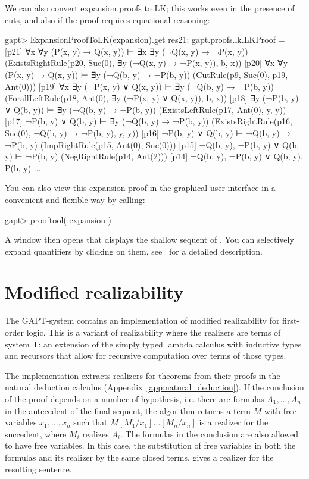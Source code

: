 \documentclass[a4paper,11pt]{book}
\newcommand{\cli}[1]{{\ttfamily {#1}}}
\begin{document}
We can also convert expansion proofs to LK; this works even in the presence of
cuts, and also if the proof requires equational reasoning:
\begin{clilisting}
gapt> ExpansionProofToLK(expansion).get
res21: gapt.proofs.lk.LKProof =
[p21] ∀x ∀y (P(x, y) → Q(x, y)) ⊢ ∃x ∃y (¬Q(x, y) → ¬P(x, y))    (ExistsRightRule(p20, Suc(0), ∃y (¬Q(x, y) → ¬P(x, y)), b, x))
[p20] ∀x ∀y (P(x, y) → Q(x, y)) ⊢ ∃y (¬Q(b, y) → ¬P(b, y))    (CutRule(p9, Suc(0), p19, Ant(0)))
[p19] ∀x ∃y (¬P(x, y) ∨ Q(x, y)) ⊢ ∃y (¬Q(b, y) → ¬P(b, y))    (ForallLeftRule(p18, Ant(0), ∃y (¬P(x, y) ∨ Q(x, y)), b, x))
[p18] ∃y (¬P(b, y) ∨ Q(b, y)) ⊢ ∃y (¬Q(b, y) → ¬P(b, y))    (ExistsLeftRule(p17, Ant(0), y, y))
[p17] ¬P(b, y) ∨ Q(b, y) ⊢ ∃y (¬Q(b, y) → ¬P(b, y))    (ExistsRightRule(p16, Suc(0), ¬Q(b, y) → ¬P(b, y), y, y))
[p16] ¬P(b, y) ∨ Q(b, y) ⊢ ¬Q(b, y) → ¬P(b, y)    (ImpRightRule(p15, Ant(0), Suc(0)))
[p15] ¬Q(b, y), ¬P(b, y) ∨ Q(b, y) ⊢ ¬P(b, y)    (NegRightRule(p14, Ant(2)))
[p14] ¬Q(b, y), ¬P(b, y) ∨ Q(b, y), P(b, y) ...

\end{clilisting}

You can also view this expansion proof in the graphical user interface in
a convenient and flexible way by calling:
\begin{clilisting}
gapt> prooftool( expansion )

\end{clilisting}

A window then opens that displays the shallow sequent of \cli{expansion}.  You
can selectively expand quantifiers by clicking on them,
see~\cite{Hetzl13Understanding} for a detailed description.

\section{Modified realizability}

The GAPT-system contains an implementation of modified realizability for first-order logic. This is a variant of realizability where the realizers are terms of system T: an extension of the simply typed lambda calculus with inductive types and recursors that allow for recursive computation over terms of those types. 

The implementation extracts realizers for theorems from their proofs in the natural deduction calculus (Appendix~\ref{app:natural_deduction}). If the conclusion of the proof depends on a number of hypothesis, i.e. there are formulas $A_1,\dots,A_n$ in the antecedent of the final sequent, the algorithm returns a term $M$ with free variables  $x_1,\dots,x_n$ such that $M[M_1/x_1]\dots[M_n/x_n]$ is a realizer for the succedent, where $M_i$ realizes $A_i$. The formulas in the conclusion are also allowed to have free variables. In this case, the substitution of free variables in both the formulas and its realizer by the same closed terms, gives a realizer for the resulting sentence.
\end{document}
